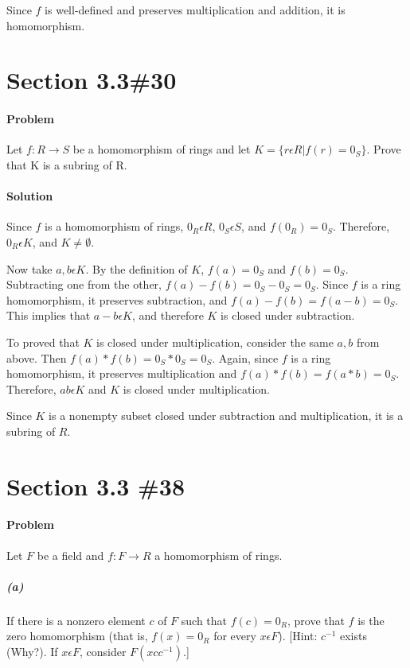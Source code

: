 \documentclass[a4paper,11pt]{article}
\begin{document}
Since $f$ is well-defined and preserves multiplication and addition, it is homomorphism.


\section{Section 3.3\#30}
\paragraph{Problem}
Let $f:R\rightarrow S$ be a homomorphism of rings and let $K = \{r\epsilon R | f(r) = 0_S\}$.
Prove that K is a subring of R.
\paragraph{Solution}

Since $f$ is a homomorphism of rings, $0_R \epsilon R$, $0_S \epsilon S$, and $f(0_R) = 0_S$. Therefore, $0_R \epsilon K$, and $K \neq \emptyset$.

Now take $a, b \epsilon K$. By the definition of $K$, $f(a) = 0_S$ and $f(b) = 0_S$. Subtracting one from the other, $f(a) - f(b) = 0_S - 0_S = 0_S$. Since $f$ is a ring homomorphism, it preserves subtraction, and $f(a) - f(b) = f(a - b) = 0_S$. This implies that $a-b \epsilon K$, and therefore $K$ is closed under subtraction.

To proved that $K$ is closed under multiplication, consider the same $a,b$ from above. Then $f(a) * f(b) = 0_S * 0_S = 0_S$. Again, since $f$ is a ring homomorphism, it preserves multiplication and $f(a) * f(b) = f(a*b) = 0_S$. Therefore, $ab \epsilon K$ and $K$ is closed under multiplication. 

Since $K$ is a nonempty subset closed under subtraction and multiplication, it is a subring of $R$.

\section{Section 3.3 \#38}
\paragraph{Problem}
Let $F$ be a field and $f:F \rightarrow R$ a homomorphism of rings.
\subparagraph{(a)}
If there is a nonzero element $c$ of $F$ such that $f(c) = 0_R$, prove that $f$ is the zero homomorphism (that is, $f(x) = 0_R$ for every $x \epsilon F$). [Hint: $c^{-1}$ exists (Why?). If $x \epsilon F$, consider $F(xcc^{-1})$.]
\end{document}
